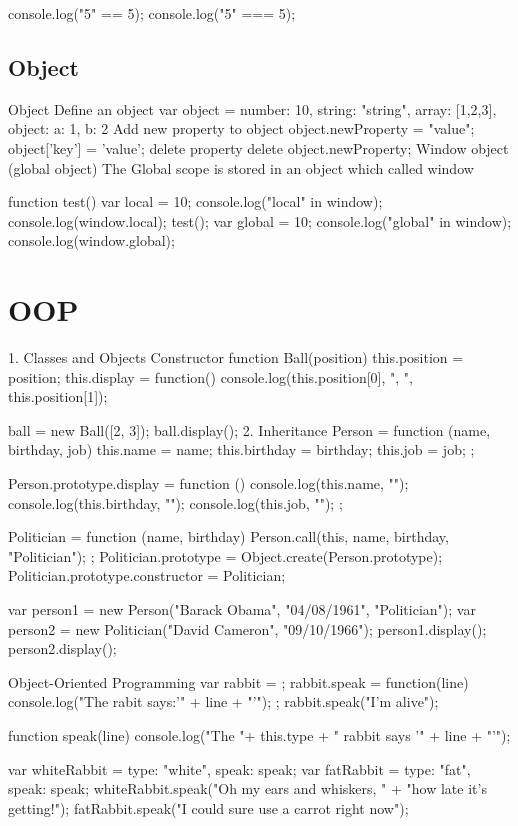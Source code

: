 console.log("5" == 5);
console.log("5" === 5);

\subsection{Object}

Object
Define an object
var object = {
  number: 10,
  string: "string",
  array: [1,2,3],
  object: {a: 1, b: 2}
}
Add new property to object
object.newProperty = "value";
object['key'] = 'value';
delete property
delete object.newProperty;
Window object (global object)
The Global scope is stored in an object which called window

function test(){
    var local = 10;
    console.log("local" in window);
    console.log(window.local);
}
test();
var global = 10;
console.log("global" in window);
console.log(window.global);

\section{OOP}


1. Classes and Objects
Constructor
function Ball(position){
    this.position = position;
    this.display = function(){
        console.log(this.position[0], ", ", this.position[1]);
    }
}

ball = new Ball([2, 3]);
ball.display();
2. Inheritance
Person = function (name, birthday, job) {
  this.name = name;
  this.birthday = birthday;
  this.job = job;
};

Person.prototype.display = function () {
  console.log(this.name, "\n");
  console.log(this.birthday, "\n");
  console.log(this.job, "\n");
};

Politician = function (name, birthday) {
  Person.call(this, name, birthday, "Politician");
};
Politician.prototype = Object.create(Person.prototype);
Politician.prototype.constructor = Politician;

var person1 = new Person("Barack Obama", "04/08/1961", "Politician");
var person2 = new Politician("David Cameron", "09/10/1966");
person1.display();
person2.display();

Object-Oriented Programming
var rabbit = {};
rabbit.speak = function(line){
console.log("The rabit says:'" + line + "'");
 };
rabbit.speak("I'm alive");

function speak(line){
   console.log("The "+ this.type + " rabbit says '" + line + "'");
 }

var whiteRabbit = {type: "white", speak: speak};
var fatRabbit = {type: "fat", speak: speak};
whiteRabbit.speak("Oh my ears and whiskers, " + "how late it's getting!");
fatRabbit.speak("I could sure use a carrot right now");

